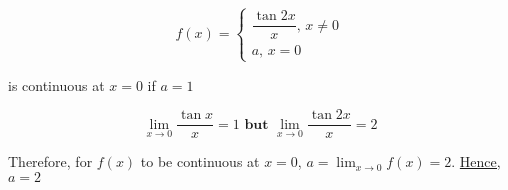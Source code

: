 \documentclass[14pt,fleqn]{extarticle}
\begin{document}
\[ f(x) = \begin{cases}
\dfrac{\tan 2x}{x},\, x\neq 0 \\ 
a,\, x = 0  
\end{cases} \]

is continuous at $x=0$ if $a = 1$
%

\newcard

\[\lim_{x\to 0}\dfrac{\tan x}{x} = 1\textbf{ but } \lim_{x\to 0}\dfrac{\tan 2x}{x} = 2 \]

Therefore, for $f(x)$ to be continuous
at $x=0$, $ a = \lim_{x\to 0}f(x) = 2$. \underline{Hence, $a = 2$}
%
\end{document}
